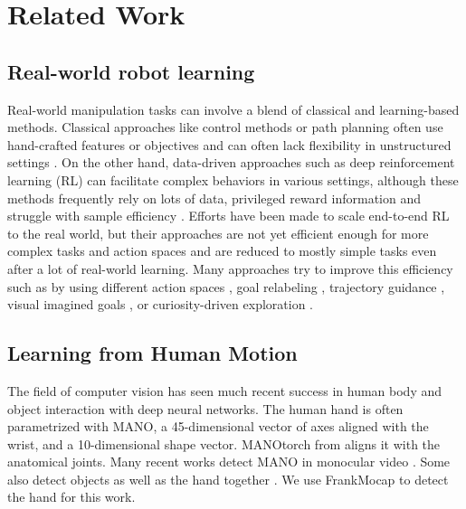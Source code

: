 \chapter{Related Work}
\label{sec:related_work}

\section{Real-world robot learning}
Real-world manipulation tasks can involve a blend of classical and learning-based methods. Classical approaches like control methods or path planning often use hand-crafted features or objectives and can often lack flexibility in unstructured settings \cite{karaman2011anytime, kuffner2000rrt, mukadam2016gaussian}. On the other hand, data-driven approaches such as deep reinforcement learning (RL) can facilitate complex behaviors in various settings, although these methods frequently rely on lots of data, privileged reward information and struggle with sample efficiency \cite{kober2008primitives, peters2010reps, lillicrap2015continuous,popov2017dataefficient, pathakICMl17curiosity}. Efforts have been made to scale end-to-end RL  \cite{levine2016learning, nair2018visual, agrawal2016learning, haarnoja2017sql, kalashnikov2018qt, kalashnikov2021mt} to the real world, but their approaches are not yet efficient enough for more complex tasks and action spaces and are reduced to mostly simple tasks even after a lot of real-world learning.  Many approaches try to improve this efficiency such as by using different action spaces \cite{vices2019martin}, goal relabeling \cite{her}, trajectory guidance \cite{levine2013guided}, visual imagined goals \cite{nair2018visual}, or curiosity-driven exploration \cite{mendonca2023alan}.

\section{Learning from Human Motion}
The field of computer vision has seen much recent success in human body and object interaction with deep neural networks.  The human hand is often parametrized with MANO, a 45-dimensional vector \cite{MANO:SIGGRAPHASIA:2017} of axes aligned with the wrist, and a 10-dimensional shape vector. MANOtorch from \cite{yang2021cpf} aligns it with the anatomical joints.   Many recent works detect MANO in monocular video \citep{wang2020rgb2hands, hmr, FrankMocap_2021_ICCV}.  Some also detect objects as well as the hand together \cite{100doh, ye2022s}.  We use FrankMocap to detect the hand for this work. 

